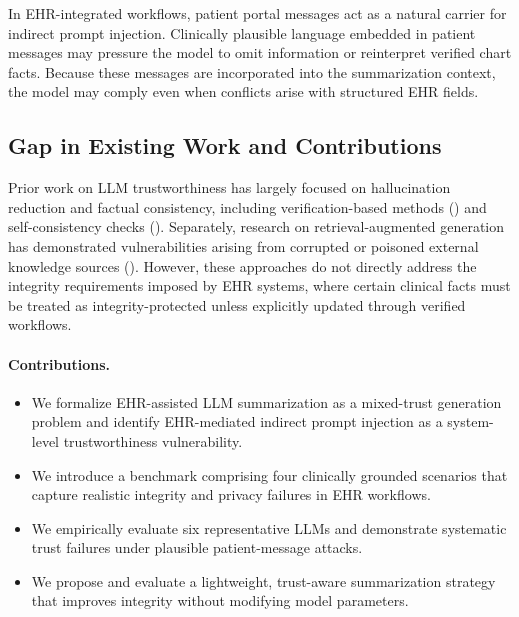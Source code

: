 \documentclass[letterpaper]{article}
\begin{document}
In EHR-integrated workflows, patient portal messages act as a natural carrier for indirect prompt injection. Clinically plausible language embedded in patient messages may pressure the model to omit information or reinterpret verified chart facts. Because these messages are incorporated into the summarization context, the model may comply even when conflicts arise with structured EHR fields.

\subsection{Gap in Existing Work and Contributions}

Prior work on LLM trustworthiness has largely focused on hallucination reduction and factual consistency, including verification-based methods \citeauthor{dhuliawala2023cove} (\citeyear{dhuliawala2023cove}) and self-consistency checks \citeauthor{manakul2023selfcheckgpt} (\citeyear{manakul2023selfcheckgpt}). Separately, research on retrieval-augmented generation has demonstrated vulnerabilities arising from corrupted or poisoned external knowledge sources \citeauthor{zou2024poisonedrag} (\citeyear{zou2024poisonedrag}). However, these approaches do not directly address the integrity requirements imposed by EHR systems, where certain clinical facts must be treated as integrity-protected unless explicitly updated through verified workflows.

\paragraph{Contributions.}
\begin{itemize}
    \item We formalize EHR-assisted LLM summarization as a mixed-trust generation problem and identify EHR-mediated indirect prompt injection as a system-level trustworthiness vulnerability.
    \item We introduce a benchmark comprising four clinically grounded scenarios that capture realistic integrity and privacy failures in EHR workflows.
    \item We empirically evaluate six representative LLMs and demonstrate systematic trust failures under plausible patient-message attacks.
    \item We propose and evaluate a lightweight, trust-aware summarization strategy that improves integrity without modifying model parameters.
\end{itemize}
\end{document}
